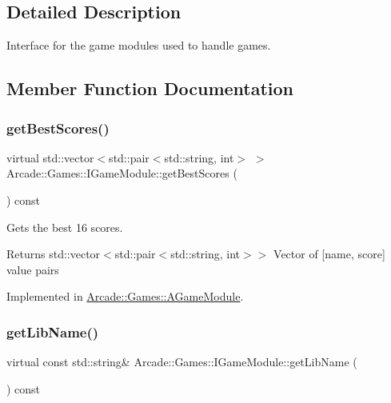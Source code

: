 \subsection{Detailed Description}
Interface for the game modules used to handle games. 

\subsection{Member Function Documentation}
\mbox{\label{classArcade_1_1Games_1_1IGameModule_afaec4931b0051ba589fbe1b14d20131b}} 
\subsubsection{\texorpdfstring{getBestScores()}{getBestScores()}}
{\footnotesize\ttfamily virtual std\+::vector$<$std\+::pair$<$std\+::string, int$>$ $>$ Arcade\+::\+Games\+::\+I\+Game\+Module\+::get\+Best\+Scores (\begin{DoxyParamCaption}{ }\end{DoxyParamCaption}) const\hspace{0.3cm}{\ttfamily [pure virtual]}}



Gets the best 16 scores. 

\begin{DoxyReturn}{Returns}
std\+::vector$<$std\+::pair$<$std\+::string, int$>$$>$ Vector of \mbox{[}name, score\mbox{]} value pairs 
\end{DoxyReturn}


Implemented in \mbox{\hyperlink{classArcade_1_1Games_1_1AGameModule_aaebba3bd5236f97cb18867fe99c7135b}{Arcade\+::\+Games\+::\+A\+Game\+Module}}.

\mbox{\label{classArcade_1_1Games_1_1IGameModule_a30966cbaa00abbd2a211cf152ea595f2}} 
\subsubsection{\texorpdfstring{getLibName()}{getLibName()}}
{\footnotesize\ttfamily virtual const std\+::string\& Arcade\+::\+Games\+::\+I\+Game\+Module\+::get\+Lib\+Name (\begin{DoxyParamCaption}{ }\end{DoxyParamCaption}) const\hspace{0.3cm}{\ttfamily [pure virtual]}}




